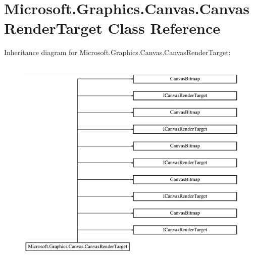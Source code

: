 \hypertarget{class_microsoft_1_1_graphics_1_1_canvas_1_1_canvas_render_target}{}\section{Microsoft.\+Graphics.\+Canvas.\+Canvas\+Render\+Target Class Reference}
\label{class_microsoft_1_1_graphics_1_1_canvas_1_1_canvas_render_target}
Inheritance diagram for Microsoft.\+Graphics.\+Canvas.\+Canvas\+Render\+Target\+:\begin{figure}[H]
\begin{center}
\leavevmode
\includegraphics[height=10.301003cm]{class_microsoft_1_1_graphics_1_1_canvas_1_1_canvas_render_target}
\end{center}
\end{figure}
